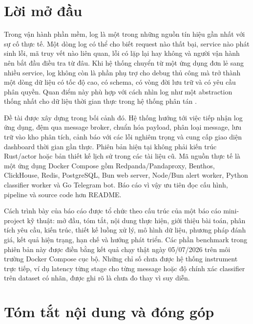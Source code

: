 \chapter*{Lời mở đầu}
{}

Trong vận hành phần mềm, log là một trong những nguồn tín hiệu gần nhất với sự cố thực tế. Một dòng log có thể cho biết request nào thất bại, service nào phát sinh lỗi, mã truy vết nào liên quan, lỗi có lặp lại hay không và người vận hành nên bắt đầu điều tra từ đâu. Khi hệ thống chuyển từ một ứng dụng đơn lẻ sang nhiều service, log không còn là phần phụ trợ cho debug thủ công mà trở thành một dòng dữ liệu có tốc độ cao, có schema, có vòng đời lưu trữ và có yêu cầu phân quyền. Quan điểm này phù hợp với cách nhìn log như một abstraction thống nhất cho dữ liệu thời gian thực trong hệ thống phân tán \cite{krepsLog,kleppmann2017}.

Đề tài \LogRider{} được xây dựng trong bối cảnh đó. Hệ thống hướng tới việc tiếp nhận log ứng dụng, đệm qua message broker, chuẩn hóa payload, phân loại message, lưu trữ vào kho phân tích, cảnh báo với các lỗi nghiêm trọng và cung cấp giao diện dashboard thời gian gần thực. Phiên bản hiện tại không phải kiến trúc Rust/actor hoặc bản thiết kế lịch sử trong các tài liệu cũ. Mã nguồn thực tế là một ứng dụng Docker Compose gồm Redpanda/Pandaproxy, Benthos, ClickHouse, Redis, PostgreSQL, Bun web server, Node/Bun alert worker, Python classifier worker và Go Telegram bot. Báo cáo vì vậy ưu tiên đọc cấu hình, pipeline và source code hơn README.

Cách trình bày của báo cáo được tổ chức theo cấu trúc của một báo cáo mini-project kỹ thuật: mở đầu, tóm tắt, nội dung thực hiện, giới thiệu bài toán, phân tích yêu cầu, kiến trúc, thiết kế luồng xử lý, mô hình dữ liệu, phương pháp đánh giá, kết quả hiện trạng, hạn chế và hướng phát triển. Các phần benchmark trong phiên bản này được điền bằng kết quả chạy thật ngày 05/07/2026 trên môi trường Docker Compose cục bộ. Những chỉ số chưa được hệ thống instrument trực tiếp, ví dụ latency từng stage cho từng message hoặc độ chính xác classifier trên dataset có nhãn, được ghi rõ là chưa đo thay vì suy diễn.

\chapter*{Tóm tắt nội dung và đóng góp}
{}

